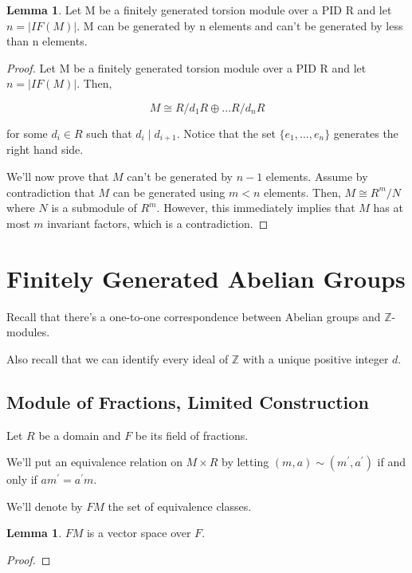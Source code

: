 \documentclass{article}
\theoremstyle{definition}
\newtheorem{lemma}[theorem]{Lemma}
\newcommand{\Z}{\mathbb{Z}}
\begin{document}
\begin{lemma}
    Let M be a finitely generated torsion module over a PID R and let $n = \lvert IF(M) \rvert$. M can be generated by n elements and can't be generated by less than n elements.
\end{lemma}
\begin{proof}
    Let M be a finitely generated torsion module over a PID R and let $n = \lvert IF(M) \rvert$. Then, 

    \[ M \cong R/d_{1}R \oplus ... R/d_{n}R\]

    for some $d_{i} \in R$ such that $d_{i} \mid d_{i + 1}$. Notice that the set $\{e_{1},...,e_{n}\}$ generates the right hand side. 
    
    We'll now prove that $M$ can't be generated by $n-1$ elements. Assume by contradiction that $M$ can be generated using $m < n$ elements. Then, $M \cong R^{m}/N$ where $N$ is a submodule of $R^{m}$. However, this immediately implies that $M$ has at most $m$ invariant factors, which is a contradiction.
\end{proof}

\newpage

\section{Finitely Generated Abelian Groups}

Recall that there's a one-to-one correspondence between Abelian groups and $\Z$-modules. 

Also recall that we can identify every ideal of $\Z$ with a unique positive integer $d$.

\subsection{Module of Fractions, Limited Construction}

Let $R$ be a domain and $F$ be its field of fractions.

We'll put an equivalence relation on $M \times R$ by letting $(m,a) \sim (m^{\prime}, a^{\prime})$ if and only if $am^{\prime} = a^{\prime}m$.

We'll denote by $FM$ the set of equivalence classes.

\begin{lemma}
    $FM$ is a vector space over $F$.
\end{lemma}
\begin{proof}
    
\end{proof}
\end{document}
